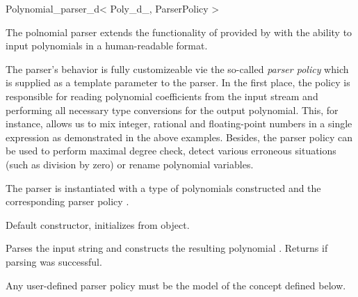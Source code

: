 % 
% 

\begin{ccRefClass}{Polynomial_parser_d< Poly_d_, ParserPolicy >}
\def\ccTagOperatorLayout{\ccFalse}


\ccDefinition

The polnomial parser extends the functionality of  provided by  with the ability to input polynomials in a human-readable format.

The parser's behavior is fully customizeable vie the so-called {\em parser policy} 
which is supplied as a template parameter to the parser. 
In the first place, the policy is responsible for reading polynomial 
coefficients from the input stream and performing all necessary type conversions
for the output polynomial. This, for instance, allows us to mix integer, rational and 
floating-point numbers in a single expression as demonstrated in the above examples.
Besides, the parser policy can be used to perform maximal degree check,
detect various erroneous situations (such as division by zero) 
or rename polynomial variables.

\ccParameters
The parser is instantiated with a type 
of polynomials constructed  and the corresponding parser policy . 


\ccCreation
{}

% 

{Default constructor, initializes from  object.}

\ccOperations

{Parses the input string  and constructs the resulting polynomial . 
Returns  if parsing was successful.} 

Any user-defined parser policy must be the model of the 
concept defined below.
\end{ccRefClass}

